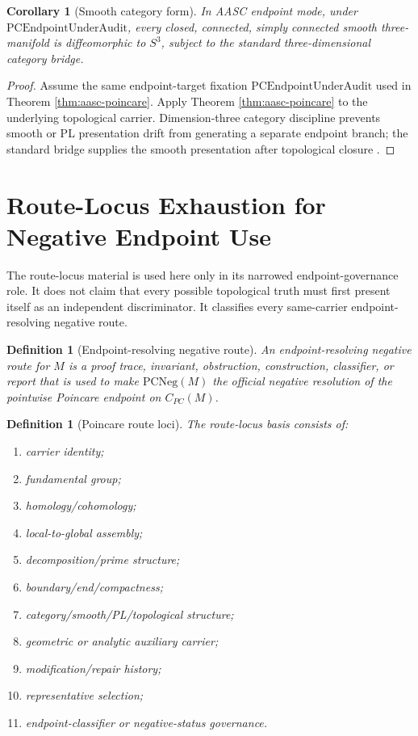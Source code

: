 \documentclass[11pt]{article}
\newtheorem{corollary}[theorem]{Corollary}
\newtheorem{definition}[theorem]{Definition}
\newcommand{\Sthree}{S^{3}}
\newcommand{\CarrierPC}{C_{PC}}
\newcommand{\PCEndpoint}{\mathrm{PCEndpointUnderAudit}}
\newcommand{\PCNeg}{\mathrm{PCNeg}}
\begin{document}
\begin{corollary}[Smooth category form]
\leavevmode\par
In AASC endpoint mode, under \(\PCEndpoint\), every closed, connected, simply connected smooth three-manifold is diffeomorphic to \(\Sthree\), subject to the standard three-dimensional category bridge.
\end{corollary}
\begin{proof}
Assume the same endpoint-target fixation \(\PCEndpoint\) used in Theorem \ref{thm:aasc-poincare}. Apply Theorem \ref{thm:aasc-poincare} to the underlying topological carrier. Dimension-three category discipline prevents smooth or PL presentation drift from generating a separate endpoint branch; the standard bridge supplies the smooth presentation after topological closure \cite{Moise1977}.
\end{proof}

\section{Route-Locus Exhaustion for Negative Endpoint Use}\label{sec:route-locus}

The route-locus material is used here only in its narrowed endpoint-governance role. It does not claim that every possible topological truth must first present itself as an independent discriminator. It classifies every same-carrier endpoint-resolving negative route.

\begin{definition}[Endpoint-resolving negative route]
An endpoint-resolving negative route for \(M\) is a proof trace, invariant, obstruction, construction, classifier, or report that is used to make \(\PCNeg(M)\) the official negative resolution of the pointwise Poincare endpoint on \(\CarrierPC(M)\).
\end{definition}

\begin{definition}[Poincare route loci]
The route-locus basis consists of:
\begin{enumerate}[label=L\arabic*.]
\item carrier identity;
\item fundamental group;
\item homology/cohomology;
\item local-to-global assembly;
\item decomposition/prime structure;
\item boundary/end/compactness;
\item category/smooth/PL/topological structure;
\item geometric or analytic auxiliary carrier;
\item modification/repair history;
\item representative selection;
\item endpoint-classifier or negative-status governance.
\end{enumerate}
\end{definition}
\end{document}

